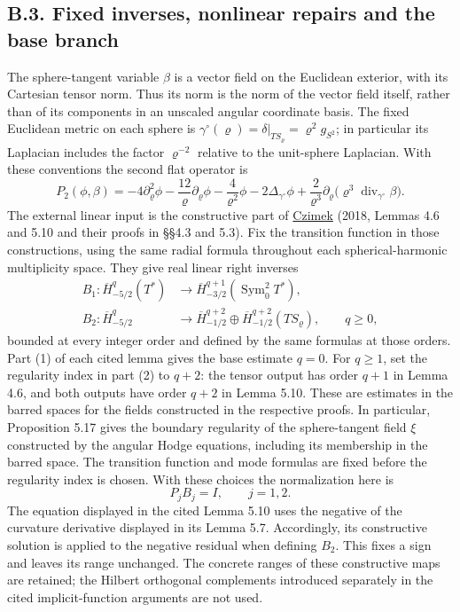 \documentclass[
  english,
  11pt,
  reqno]{amsart}
\begin{document}
\subsection{B.3. Fixed inverses, nonlinear repairs and the base
branch}\label{b.3.-fixed-inverses-nonlinear-repairs-and-the-base-branch}\label{sec:online-extension-linear-and-base}

The sphere-tangent variable \(\beta\) is a vector field on the Euclidean
exterior, with its Cartesian tensor norm. Thus its norm is the norm of
the vector field itself, rather than of its components in an unscaled
angular coordinate basis. The fixed Euclidean metric on each sphere is
\(\gamma^\circ(\varrho)=\delta|_{TS_\varrho}=\varrho^2g_{S^2}\); in
particular its Laplacian includes the factor \(\varrho^{-2}\) relative
to the unit-sphere Laplacian. With these conventions the second flat
operator is%
 \[
P_2(\phi,\beta)
=-4\partial_\varrho^2\phi
-\frac{12}{\varrho}\partial_\varrho\phi
-\frac{4}{\varrho^2}\phi
-2\Delta_{\gamma^\circ}\phi
+\frac{2}{\varrho^3}\partial_\varrho
  \bigl(\varrho^3\operatorname{div}_{\gamma^\circ}\beta\bigr).
\] The external linear input is the constructive part of
\hyperref[ref-Czimek2018]{Czimek} (2018, Lemmas 4.6 and 5.10 and their
proofs in §§4.3 and 5.3). Fix the transition function in those
constructions, using the same radial formula throughout each
spherical-harmonic multiplicity space. They give real linear right
inverses \[
\begin{aligned}
B_1:\overline H^{q}_{-5/2}(T^*)
&\longrightarrow
\overline H^{q+1}_{-3/2}(\operatorname{Sym}^2_0T^*),\\
B_2:\overline H^{q}_{-5/2}
&\longrightarrow
\overline H^{q+2}_{-1/2}\oplus
\overline H^{q+2}_{-1/2}(TS_\varrho),
\qquad q\ge0,
\end{aligned}
\] bounded at every integer order and defined by the same formulas at
those orders. Part (1) of each cited lemma gives the base estimate
\(q=0\). For \(q\ge1\), set the regularity index in part (2) to \(q+2\):
the tensor output has order \(q+1\) in Lemma 4.6, and both outputs have
order \(q+2\) in Lemma 5.10. These are estimates in the barred spaces
for the fields constructed in the respective proofs. In particular,
Proposition 5.17 gives the boundary regularity of the sphere-tangent
field \(\xi\) constructed by the angular Hodge equations, including its
membership in the barred space. The transition function and mode
formulas are fixed before the regularity index is chosen. With these
choices the normalization here is \[
P_jB_j=I,\qquad j=1,2.
\] The equation displayed in the cited Lemma 5.10 uses the negative of
the curvature derivative displayed in its Lemma 5.7. Accordingly, its
constructive solution is applied to the negative residual when defining
\(B_2\). This fixes a sign and leaves its range unchanged. The concrete
ranges of these constructive maps are retained; the Hilbert orthogonal
complements introduced separately in the cited implicit-function
arguments are not used.
\end{document}
